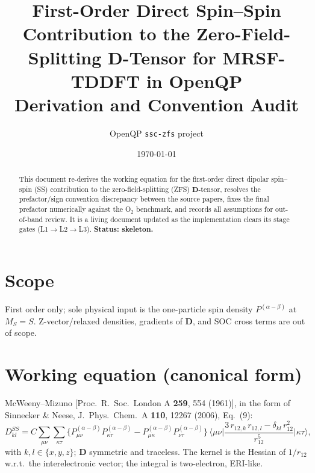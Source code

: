 \documentclass[11pt]{article}
\title{First-Order Direct Spin--Spin Contribution to the Zero-Field-Splitting
$\mathbf{D}$-Tensor for MRSF-TDDFT in OpenQP\\[4pt]\large Derivation and Convention Audit}
\author{OpenQP \texttt{ssc-zfs} project}
\date{\today}
\newcommand{\Pab}{P^{(\alpha-\beta)}}
\newcommand{\rkl}{\dfrac{3\,r_{12,k}\,r_{12,l}-\delta_{kl}\,r_{12}^2}{r_{12}^5}}
\begin{document}
\maketitle

\begin{abstract}
This document re-derives the working equation for the first-order direct dipolar spin--spin (SS)
contribution to the zero-field-splitting (ZFS) $\mathbf{D}$-tensor, resolves the prefactor/sign
convention discrepancy between the source papers, fixes the final prefactor numerically against
the O$_2$ benchmark, and records all assumptions for out-of-band review. It is a living document
updated as the implementation clears its stage gates (L1$\to$L2$\to$L3). \textbf{Status: skeleton.}
\end{abstract}

\tableofcontents

\section{Scope}
First order only; sole physical input is the one-particle spin density $\Pab$ at $M_S=S$.
Z-vector/relaxed densities, gradients of $\mathbf{D}$, and SOC cross terms are out of scope.

\section{Working equation (canonical form)}
McWeeny--Mizuno [Proc.\ R.\ Soc.\ London A \textbf{259}, 554 (1961)], in the form of
Sinnecker \& Neese, J.\ Phys.\ Chem.\ A \textbf{110}, 12267 (2006), Eq.~(9):
\begin{equation}
D^{SS}_{kl} = C \sum_{\mu\nu}\sum_{\kappa\tau}
  \Big\{\Pab_{\mu\nu}\Pab_{\kappa\tau}-\Pab_{\mu\kappa}\Pab_{\nu\tau}\Big\}\,
  \Big\langle \mu\nu \Big| \rkl \Big| \kappa\tau \Big\rangle ,
  \label{eq:working}
\end{equation}
with $k,l\in\{x,y,z\}$; $\mathbf{D}$ symmetric and traceless. The kernel is the Hessian of
$1/r_{12}$ w.r.t.\ the interelectronic vector; the integral is two-electron, ERI-like.
\end{document}
